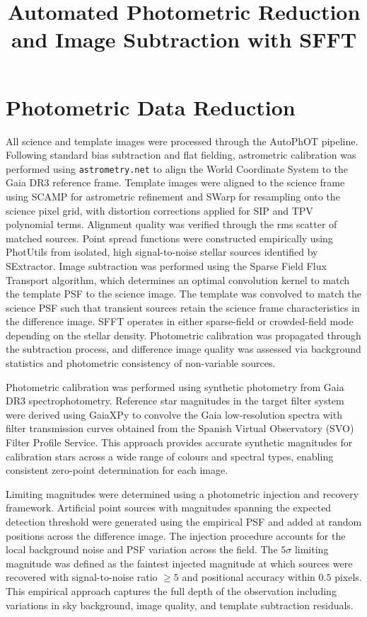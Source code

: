 \documentclass[11pt,a4paper]{article}
\title{Automated Photometric Reduction and Image Subtraction with SFFT}
\author{}
\date{}
\begin{document}
\maketitle

\section*{Photometric Data Reduction}

All science and template images were processed through the AutoPhOT pipeline\cite{brennan2022autophot}. Following standard bias subtraction and flat fielding, astrometric calibration was performed using \texttt{astrometry.net}\cite{lang2010astrometry} to align the World Coordinate System to the Gaia DR3 reference frame\cite{gaia2023dr3}. Template images were aligned to the science frame using SCAMP\cite{bertin2006scamp} for astrometric refinement and SWarp\cite{bertin2010swarp} for resampling onto the science pixel grid, with distortion corrections applied for SIP and TPV polynomial terms. Alignment quality was verified through the rms scatter of matched sources. Point spread functions were constructed empirically using PhotUtils\cite{bradley2022photutils} from isolated, high signal-to-noise stellar sources identified by SExtractor\cite{bertin1996sextractor}. Image subtraction was performed using the Sparse Field Flux Transport algorithm\cite{russell2022sfft}, which determines an optimal convolution kernel to match the template PSF to the science image. The template was convolved to match the science PSF such that transient sources retain the science frame characteristics in the difference image. SFFT operates in either sparse-field or crowded-field mode depending on the stellar density. Photometric calibration was propagated through the subtraction process, and difference image quality was assessed via background statistics and photometric consistency of non-variable sources.

Photometric calibration was performed using synthetic photometry from Gaia DR3 spectrophotometry. Reference star magnitudes in the target filter system were derived using GaiaXPy\cite{weiler2023gaiaxpy} to convolve the Gaia low-resolution spectra with filter transmission curves obtained from the Spanish Virtual Observatory (SVO) Filter Profile Service\cite{rodrigo2012svo}. This approach provides accurate synthetic magnitudes for calibration stars across a wide range of colours and spectral types, enabling consistent zero-point determination for each image.

Limiting magnitudes were determined using a photometric injection and recovery framework. Artificial point sources with magnitudes spanning the expected detection threshold were generated using the empirical PSF and added at random positions across the difference image. The injection procedure accounts for the local background noise and PSF variation across the field. The $5\sigma$ limiting magnitude was defined as the faintest injected magnitude at which sources were recovered with signal-to-noise ratio $\geq 5$ and positional accuracy within $0.5$ pixels. This empirical approach captures the full depth of the observation including variations in sky background, image quality, and template subtraction residuals.
\end{document}

